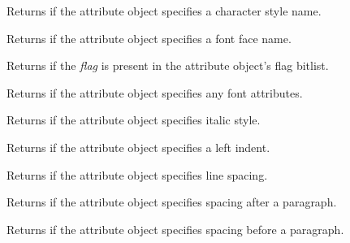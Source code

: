 Returns \true if the attribute object specifies a character style name.

\label{wxrichtextattrhasfacename}


Returns \true if the attribute object specifies a font face name.

\label{wxrichtextattrhasflag}


Returns \true if the {\it flag} is present in the attribute object's flag bitlist.

\label{wxrichtextattrhasfont}


Returns \true if the attribute object specifies any font attributes.

\label{wxrichtextattrhasitalic}


Returns \true if the attribute object specifies italic style.

\label{wxrichtextattrhasleftindent}


Returns \true if the attribute object specifies a left indent.

\label{wxrichtextattrhaslinespacing}


Returns \true if the attribute object specifies line spacing.

\label{wxrichtextattrhasparagraphspacingafter}


Returns \true if the attribute object specifies spacing after a paragraph.

\label{wxrichtextattrhasparagraphspacingbefore}


Returns \true if the attribute object specifies spacing before a paragraph.

